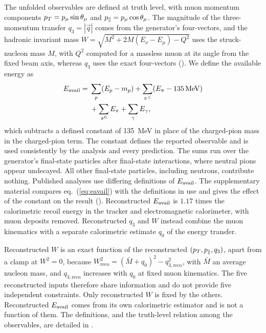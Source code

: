 The unfolded observables are defined at truth level, with muon momentum components $p_{T}=p_{\mu}\sin\theta_{\mu}$ and $p_{\parallel}=p_{\mu}\cos\theta_{\mu}$. The magnitude of the three-momentum transfer $q_{3}=|\vec{q}|$ comes from the generator's four-vectors, and the hadronic invariant mass $W=\sqrt{M^{2}+2M(E_{\nu}-E_{\mu})-Q^{2}}$ uses the struck-nucleon mass $M$, with $Q^{2}$ computed for a massless muon at its angle from the fixed beam axis, whereas $q_{3}$ uses the exact four-vectors (). We define the available energy as
\begin{equation}
\begin{split}
E_{\mathrm{avail}}={}&\sum_{p}(E_{p}-m_{p})+\sum_{\pi^{\pm}}(E_{\pi}-\SI{135}{MeV})\\
&+\sum_{\pi^{0}}E_{\pi}+\sum_{\gamma}E_{\gamma},
\end{split}
\label{eq:eavail}
\end{equation}
which subtracts a defined constant of \SI{135}{MeV} in place of the charged-pion mass in the charged-pion term. The constant defines the reported observable and is used consistently by the analysis and every prediction. The sums run over the generator's final-state particles after final-state interactions, where neutral pions appear undecayed. All other final-state particles, including neutrons, contribute nothing. Published analyses use differing definitions of $E_{\mathrm{avail}}$. The supplementary material compares eq.~(\ref{eq:eavail}) with the definitions in use and gives the effect of the constant on the result (). Reconstructed $E_{\mathrm{avail}}$ is $1.17$ times the calorimetric recoil energy in the tracker and electromagnetic calorimeter, with muon deposits removed. Reconstructed $q_{3}$ and $W$ instead combine the muon kinematics with a separate calorimetric estimate $q_{0}$ of the energy transfer.

Reconstructed $W$ is an exact function of the reconstructed $(p_{T},p_{\parallel},q_{3})$, apart from a clamp at $W^{2}=0$, because $W_{\mathrm{reco}}^{2}=(\bar M+q_{0})^{2}-q_{3,\mathrm{reco}}^{2}$, with $\bar M$ an average nucleon mass, and $q_{3,\mathrm{reco}}$ increases with $q_{0}$ at fixed muon kinematics. The five reconstructed inputs therefore share information and do not provide five independent constraints. Only reconstructed $W$ is fixed by the others. Reconstructed $E_{\mathrm{avail}}$ comes from its own calorimetric estimator and is not a function of them. The definitions, and the truth-level relation among the observables, are detailed in .

